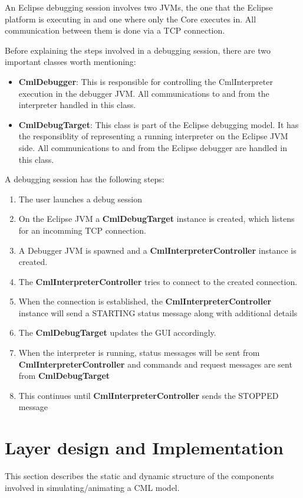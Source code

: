 \documentclass[a4paper, 10pt]{include/compassreport}   %
\begin{document}
An Eclipse debugging session involves two JVMs, the one that the Eclipse
platform is executing in and one where only the Core executes in. All
communication between them is done via a TCP connection. 

Before explaining the steps involved in a debugging session, there are
two important classes worth mentioning:

\begin{itemize}
\item \textbf{CmlDebugger}: This is responsible for
  controlling the CmlInterpreter execution in the debugger JVM.  All
  communications to and from the interpreter handled in this class.
  
\item \textbf{CmlDebugTarget}: This class is part of the Eclipse
  debugging model. It has the responsiblity of representing a running
  interpreter on the Eclipse JVM side. All communications to and from
  the Eclipse debugger are handled in this class.
\end{itemize}

A debugging session has the following steps:
\begin{enumerate}
\item The user launches a debug session
\item On the Eclipse JVM a \textbf{CmlDebugTarget} instance is
  created, which listens for an incomming TCP connection.
\item A Debugger JVM is spawned and a
  \textbf{CmlInterpreterController} instance is created.
\item The \textbf{CmlInterpreterController} tries to connect to the
  created connection.
\item When the connection is established, the
  \textbf{CmlInterpreterController} instance will send a STARTING status
  message along with additional details
\item The \textbf{CmlDebugTarget} updates the GUI accordingly.
\item When the interpreter is running, status messages will be sent from \textbf{CmlInterpreterController} and commands and request messages are sent from \textbf{CmlDebugTarget}
\item This continues until \textbf{CmlInterpreterController} sends the STOPPED message
\end{enumerate}


\section{Layer design and Implementation}
This section describes the static and dynamic structure of the
components involved in simulating/animating a CML model.
\end{document}
